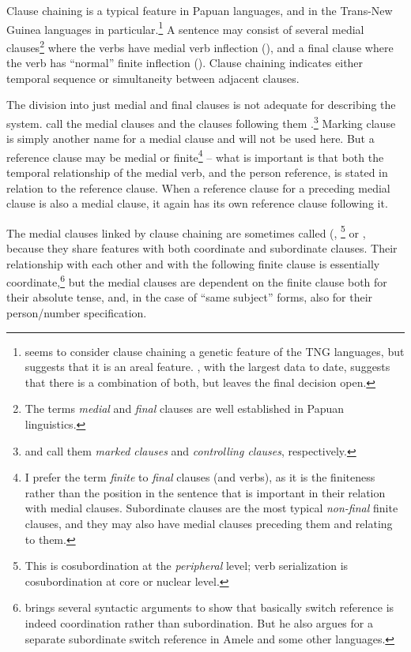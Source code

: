 Clause chaining is a typical feature in Papuan languages, and in the Trans-New Guinea languages in particular.\footnote{\citet[36]{Wurm1982} seems to consider clause chaining a genetic feature of the TNG languages, but \citet[xlvii]{Haiman1980} suggests that it is an areal feature. \citet[122]{Roberts1997}, with the largest data to date, suggests that there is a combination of both, but leaves the final decision open.}  A sentence may consist of several medial clauses\footnote{The terms \textit{medial} and \textit{final} clauses are well established in Papuan linguistics. }   where the verbs have medial verb inflection (), and a final clause where the verb has ``normal'' finite inflection (). Clause chaining indicates either temporal sequence or simultaneity between adjacent clauses.

The division into just medial and final clauses is not adequate for describing the system. \citet[xii]{HaimanEtAt1983} call the medial clauses  and the clauses following them .\footnote{\citet{Comrie1983} and \citet{Roberts1997} call them \textit{marked clauses} and \textit{controlling clauses}, respectively.} Marking clause is simply another name for a medial clause and will not be used here. But a reference clause may be medial or finite\footnote{I prefer the term \textit{finite} to \textit{final} clauses (and verbs), as it is the finiteness rather than the position in the sentence that is important in their relation with medial clauses. Subordinate clauses are the most typical \textit{non-final} finite clauses, and they may also have medial clauses preceding them and relating to them.} -- what is important is that both the temporal relationship of the medial verb, and the person reference, is stated in relation to the reference clause. When a reference clause for a preceding medial clause is also a medial clause, it again has its own reference clause following it.

The medial clauses linked by clause chaining are sometimes called  (\citealt{Olson1981}, \citealt[257]{FoleyEtAl1984} \footnote{This is cosubordination at the \textit{peripheral} level; verb serialization is cosubordination at core or nuclear level.} or  \citep[177]{Foley1986}, because they share features with both coordinate and subordinate clauses. Their relationship with each other and with the following finite clause is essentially coordinate,\footnote{\citet{Roberts1988a} brings several syntactic arguments to show that basically switch reference is indeed coordination rather than subordination. But he also argues for a separate subordinate switch reference in Amele and some other languages.} but the medial clauses are dependent on the finite clause both for their absolute tense, and, in the case of ``same subject'' forms, also for their person/number specification. 

